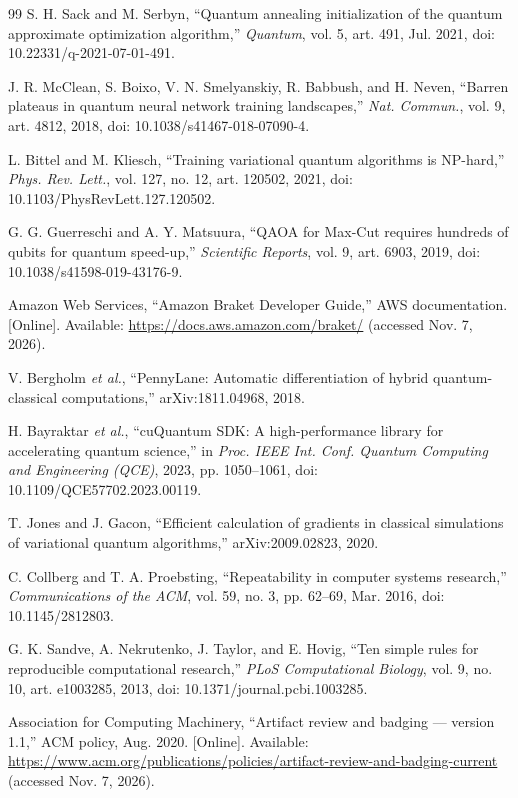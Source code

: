 \documentclass{ieeeaccess}
\begin{document}
\begin{thebibliography}{99}
 S. H. Sack and M. Serbyn, ``Quantum annealing initialization of the quantum approximate optimization algorithm,'' \textit{Quantum}, vol. 5, art. 491, Jul. 2021, doi: 10.22331/q-2021-07-01-491.

 J. R. McClean, S. Boixo, V. N. Smelyanskiy, R. Babbush, and H. Neven, ``Barren plateaus in quantum neural network training landscapes,'' \textit{Nat. Commun.}, vol. 9, art. 4812, 2018, doi: 10.1038/s41467-018-07090-4.

 L. Bittel and M. Kliesch, ``Training variational quantum algorithms is NP-hard,'' \textit{Phys. Rev. Lett.}, vol. 127, no. 12, art. 120502, 2021, doi: 10.1103/PhysRevLett.127.120502.

 G. G. Guerreschi and A. Y. Matsuura, ``QAOA for Max-Cut requires hundreds of qubits for quantum speed-up,'' \textit{Scientific Reports}, vol. 9, art. 6903, 2019, doi: 10.1038/s41598-019-43176-9.

 Amazon Web Services, ``Amazon Braket Developer Guide,'' AWS documentation. [Online]. Available: {\url{https://docs.aws.amazon.com/braket/}} (accessed Nov. 7, 2026).

 V. Bergholm \textit{et al.}, ``PennyLane: Automatic differentiation of hybrid quantum-classical computations,'' arXiv:1811.04968, 2018.

 H. Bayraktar \textit{et al.}, ``cuQuantum SDK: A high-performance library for accelerating quantum science,'' in \textit{Proc. IEEE Int. Conf. Quantum Computing and Engineering (QCE)}, 2023, pp. 1050--1061, doi: 10.1109/QCE57702.2023.00119.

 T. Jones and J. Gacon, ``Efficient calculation of gradients in classical simulations of variational quantum algorithms,'' arXiv:2009.02823, 2020.

 C. Collberg and T. A. Proebsting, ``Repeatability in computer systems research,'' \textit{Communications of the ACM}, vol. 59, no. 3, pp. 62--69, Mar. 2016, doi: 10.1145/2812803.

 G. K. Sandve, A. Nekrutenko, J. Taylor, and E. Hovig, ``Ten simple rules for reproducible computational research,'' \textit{PLoS Computational Biology}, vol. 9, no. 10, art. e1003285, 2013, doi: 10.1371/journal.pcbi.1003285.

 Association for Computing Machinery, ``Artifact review and badging --- version 1.1,'' ACM policy, Aug. 2020. [Online]. Available: {\url{https://www.acm.org/publications/policies/artifact-review-and-badging-current}} (accessed Nov. 7, 2026).


\end{thebibliography}
\end{document}
